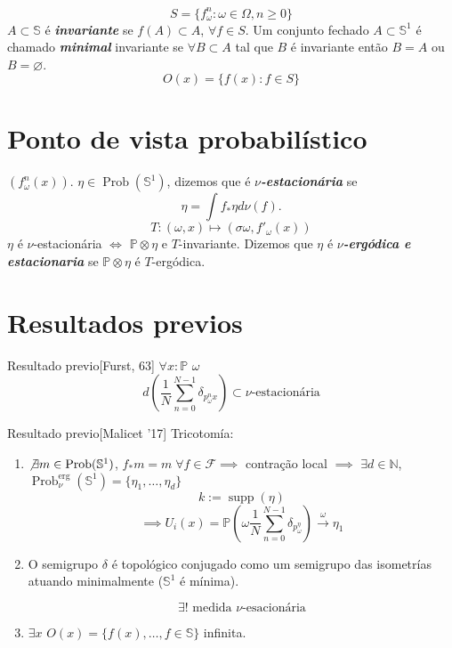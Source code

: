  \[S=\{f^n_{\omega}:\omega \in\Omega,n \geq 0\}\]
 $A\subset \mathbb{S}$ é \textit{\textbf{invariante}} se  $f(A)\subset A$, $\forall f\in S$. Um conjunto fechado $A\subset \mathbb{S}^1$ é chamado \textit{\textbf{minimal}} invariante se  $\forall B\subset A$ tal que $B$ é invariante então $B=A$ ou  $B=\varnothing $.
  \[O(x)=\{f(x):f\in S\}\]

 \section{Ponto de vista probabilístico}

$(f^n_\omega(x))$. $\eta\in\operatorname{Prob}(\mathbb{S}^1)$, dizemos que é  \textit{\textbf{$ \nu$-estacionária}} se
\[\eta=\int f_*\eta d\nu(f).\]
\[T:(\omega,x)\longmapsto(\sigma\omega,f'_\omega(x))\]
$\eta$ é $\nu$-estacionária  $\iff$ $\mathbb{P}\otimes \eta$ e $T$-invariante. Dizemos que $\eta$ é \textit{\textbf{$\nu$-ergódica e estacionaria}} se $\mathbb{P}\otimes \eta$ é $T$-ergódica.

\section{Resultados previos}

\begin{idea1}{Resultado previo}[Furst, 63]\leavevmode
	$\forall x:\mathbb{P}$ $\omega$
	\[d\left( \frac{1}{N}\sum_{n=0}^{N-1} \delta_{p^n_\omega x} \right) \subset \nu \text{-estacionária}  \]
\end{idea1}

\begin{idea1}{Resultado previo}[Malicet '17]\leavevmode
	Tricotomía:
	\begin{enumerate}
	\item $\not \exists m\in\operatorname{Prob}(\mathbb{S}^1)$, $f_*m=m\;\forall f\in\mathcal{F}\implies $ contração local $\implies $ $\exists d\in\mathbb{N}$, $\operatorname{Prob}_{\nu}^{\operatorname{erg}}(\mathbb{S}^1)=\{\eta_1,\ldots,\eta_d\}$ 
			\[k:=\operatorname{supp}(\eta)\]
			\[\implies U_i(x)=\mathbb{P}\left(\omega\frac{1}{N}\sum_{n=0}^{N-1}\delta_{p_\omega^\eta}\right)\overset{\omega}{\longrightarrow}\eta_1\]
	
		\item O semigrupo $\delta$ é topológico conjugado como um semigrupo das isometrías atuando minimalmente ($\mathbb{S}^1$ é mínima).

			\[\exists ! \text{ medida $\nu$-esacionária} \]

		\item $\exists x$ $O(x)=\{f(x),\ldots,f\in\mathbb{S}\}$ infinita.
	\end{enumerate}
\end{idea1}

